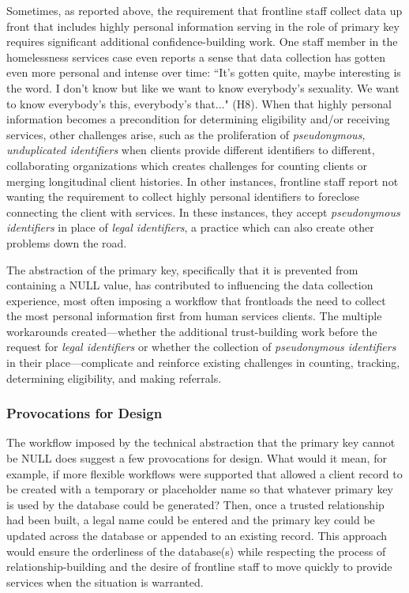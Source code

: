 Sometimes, as reported above, the requirement that frontline staff collect data up front that includes highly personal information serving in the role of primary key requires significant additional confidence-building work. One staff member in the homelessness services case even reports a sense that data collection has gotten even more personal and intense over time: ``It's gotten quite, maybe interesting is the word. I don't know but like we want to know everybody's sexuality. We want to know everybody's this, everybody's that..." (H8). When that highly personal information becomes a precondition for determining eligibility and/or receiving services, other challenges arise, such as the proliferation of \textit{pseudonymous, unduplicated identifiers} when clients provide different identifiers to different, collaborating organizations which creates challenges for counting clients or merging longitudinal client histories. In other instances, frontline staff report not wanting the requirement to collect highly personal identifiers to foreclose connecting the client with services. In these instances, they accept \textit{pseudonymous identifiers} in place of \textit{legal identifiers}, a practice which can also create other problems down the road.

The abstraction of the primary key, specifically that it is prevented from containing a NULL value, has contributed to influencing the data collection experience, most often imposing a workflow that frontloads the need to collect the most personal information first from human services clients. The multiple workarounds created---whether the additional trust-building work before the request for \textit{legal identifiers} or whether the collection of \textit{pseudonymous identifiers} in their place---complicate and reinforce existing challenges in counting, tracking, determining eligibility, and making referrals. 

\subsubsection{Provocations for Design}
The workflow imposed by the technical abstraction that the primary key cannot be NULL does suggest a few provocations for design. What would it mean, for example, if more flexible workflows were supported that allowed a client record to be created with a temporary or placeholder name so that whatever primary key is used by the database could be generated? Then, once a trusted relationship had been built, a legal name could be entered and the primary key could be updated across the database or appended to an existing record. This approach would ensure the orderliness of the database(s) while respecting the process of relationship-building and the desire of frontline staff to move quickly to provide services when the situation is warranted.

